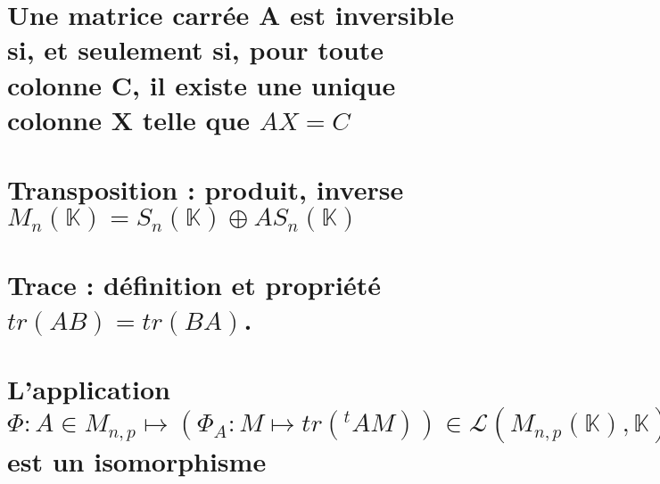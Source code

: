 \documentclass{article}
\begin{document}
	\section{Une matrice carrée A est inversible si, et seulement si, pour toute colonne C, il existe une unique colonne X telle que $AX=C$}
	\section{Transposition : produit, inverse $M_n(\mathbb K)= S_n(\mathbb K) \oplus AS_n(\mathbb K)$}
	\section{Trace : définition et propriété $tr(AB)=tr(BA)$.}
	\section{L'application $\Phi : A \in M_{n,p} \longmapsto (\Phi_A : M \mapsto tr({}^tAM))\in \mathcal L(M_{n,p}(\mathbb K), \mathbb K)$ est un isomorphisme}
\end{document}
